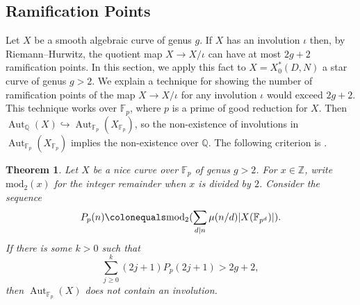 \documentclass[12pt]{amsart}
\newcommand{\F}{\mathbb{F}}
\newcommand{\Q}{\mathbb{Q}}
\newcommand{\Z}{\mathbb{Z}}
\DeclareMathOperator{\Aut}{Aut}
\numberwithin{equation}{subsection}
\newtheorem{theorem}[equation]{Theorem}
\theoremstyle{plain}\newtheorem{ithm}{Theorem}
\theoremstyle{plain}\newtheorem{iprop}[ithm]{Proposition}
\theoremstyle{definition}
\theoremstyle{remark}
\newcommand{\StarCurve}[2]{X_0^*({#1},{#2})} %
\begin{document}
\subsection{Ramification Points}\label{sec:ramification}
Let $X$ be a smooth algebraic curve of genus $g$. If $X$ has an involution $\iota$ then, by Riemann--Hurwitz, the quotient map $X \to X/\iota$ can have at most $2g+2$ ramification points. In this section, we apply this fact to   $X = \StarCurve{D}{N}$  a star curve of genus $g > 2$. 
We explain a technique for showing the number of ramification points of the map $X \to X/\iota$  for any involution $\iota$ would exceed $2g+2$. This technique works over $\F_p$, where $p$ is a prime of good reduction for $X$. Then  $\Aut_\Q(X) \hookrightarrow \Aut_{\F_p}(X_{\F_p})$, so the non-existence of involutions in $\Aut_{\F_p}(X_{\F_p})$ implies the non-existence over $\Q$.
The following criterion is  \cite[Remark 2.2]{GonzalezAut}.
\begin{theorem}
\label{thm:fpauts}
    Let $X$ be a nice curve over $\F_p$ of genus $g>2$. 
    For $x \in \Z$, write $\mathrm{mod_2}(x)$ for the integer remainder when $x$ is divided by $2$.
    Consider the sequence
    \[ P_p(n) \colonequals  \mathrm{mod}_2 ( \sum_{d|n}  \mu(n/d) | X(\F_{p^d})|) .\]
    If there is some $k > 0 $ such that 
    \[  \sum_{j \geq 0}^k (2j+1) P_p(2j+1) > 2g +2,\] then $\Aut_{\F_p}(X)$ does not contain an involution.
\end{theorem}
\end{document}
